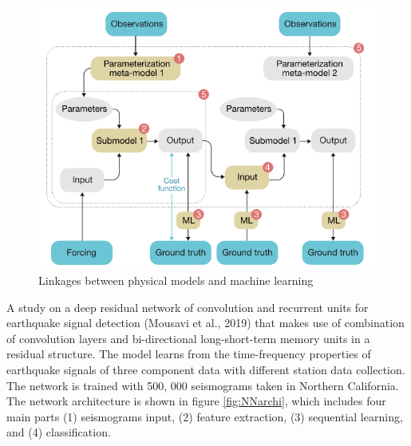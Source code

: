 \begin{figure}
    \centering
    \includegraphics[scale=0.6]{images/MLarchi.png}
    \caption{Linkages between physical models and machine learning}
    \label{fig:MLarchi}
\end{figure}


A study on a deep residual network of convolution and recurrent units for earthquake signal detection (Mousavi et al., 2019) that makes use of combination of convolution layers and bi-directional long-short-term memory units in a residual structure. The model learns from the time-frequency properties of earthquake signals of three component data with different station data collection. The network is trained with 500, 000 seismograms taken in Northern California. The network architecture is shown in figure \ref{fig:NNarchi}, which includes four main parts (1) seismograms input, (2) feature extraction, (3) sequential learning, and (4) classification.   


